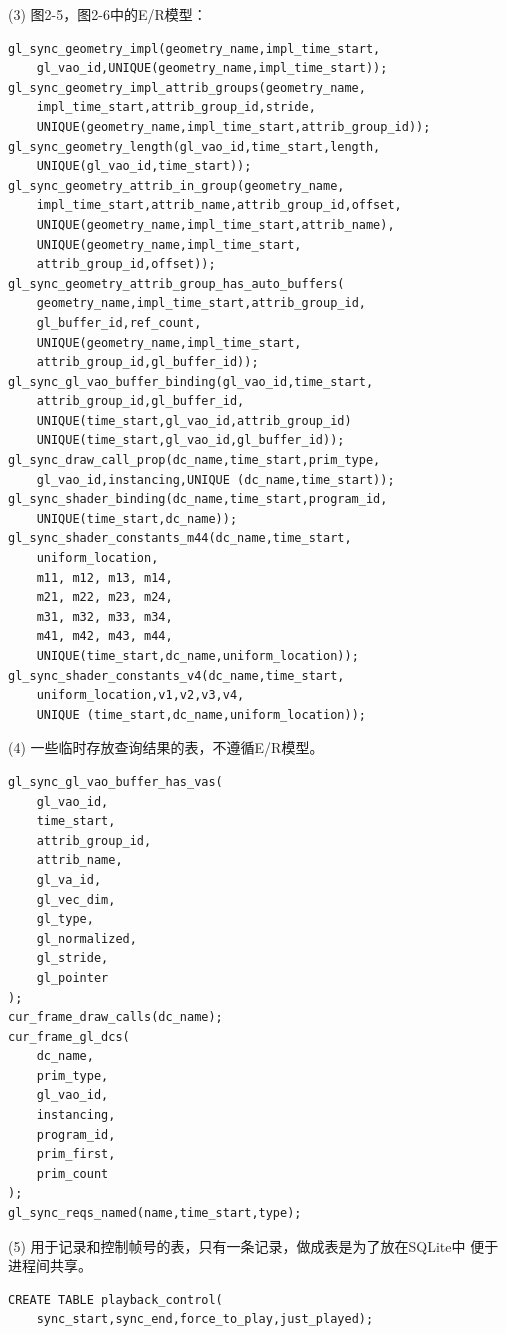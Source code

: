 \documentclass[12pt,a4paper]{article}
\begin{document}
\vspace{10mm}
\noindent (3) 图2-5，图2-6中的E/R模型：
\begin{lstlisting}
gl_sync_geometry_impl(geometry_name,impl_time_start,
	gl_vao_id,UNIQUE(geometry_name,impl_time_start));
gl_sync_geometry_impl_attrib_groups(geometry_name,
	impl_time_start,attrib_group_id,stride,
	UNIQUE(geometry_name,impl_time_start,attrib_group_id));
gl_sync_geometry_length(gl_vao_id,time_start,length,
	UNIQUE(gl_vao_id,time_start));
gl_sync_geometry_attrib_in_group(geometry_name,
	impl_time_start,attrib_name,attrib_group_id,offset,
	UNIQUE(geometry_name,impl_time_start,attrib_name),
	UNIQUE(geometry_name,impl_time_start,
	attrib_group_id,offset));
gl_sync_geometry_attrib_group_has_auto_buffers(
	geometry_name,impl_time_start,attrib_group_id,
	gl_buffer_id,ref_count,
	UNIQUE(geometry_name,impl_time_start,
	attrib_group_id,gl_buffer_id));
gl_sync_gl_vao_buffer_binding(gl_vao_id,time_start,
	attrib_group_id,gl_buffer_id,
	UNIQUE(time_start,gl_vao_id,attrib_group_id)
	UNIQUE(time_start,gl_vao_id,gl_buffer_id));
gl_sync_draw_call_prop(dc_name,time_start,prim_type,
	gl_vao_id,instancing,UNIQUE (dc_name,time_start));
gl_sync_shader_binding(dc_name,time_start,program_id,
	UNIQUE(time_start,dc_name));
gl_sync_shader_constants_m44(dc_name,time_start,
	uniform_location,
	m11, m12, m13, m14, 
	m21, m22, m23, m24, 
	m31, m32, m33, m34,
	m41, m42, m43, m44,
	UNIQUE(time_start,dc_name,uniform_location));
gl_sync_shader_constants_v4(dc_name,time_start,
	uniform_location,v1,v2,v3,v4,
	UNIQUE (time_start,dc_name,uniform_location));
\end{lstlisting}

\vspace {10mm}
\noindent (4) 一些临时存放查询结果的表，不遵循E/R模型。
\begin{lstlisting}
gl_sync_gl_vao_buffer_has_vas(
	gl_vao_id,
	time_start,
	attrib_group_id,
	attrib_name,
	gl_va_id,
	gl_vec_dim,
	gl_type,
	gl_normalized,
	gl_stride,
	gl_pointer
);
cur_frame_draw_calls(dc_name);
cur_frame_gl_dcs(
	dc_name,
	prim_type,
	gl_vao_id,
	instancing,
	program_id,
	prim_first,
	prim_count
);
gl_sync_reqs_named(name,time_start,type);
\end{lstlisting}

\newpage
\noindent (5) 用于记录和控制帧号的表，只有一条记录，做成表是为了放在SQLite中%
便于进程间共享。
\begin{lstlisting}
CREATE TABLE playback_control(
	sync_start,sync_end,force_to_play,just_played);
\end{lstlisting}
\end{document}
